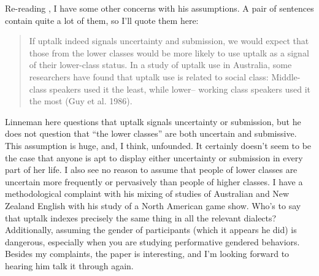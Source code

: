 \documentclass[man,12pt]{apa6}
\begin{document}
Re-reading \citet{Linneman13}, I have some other concerns with his assumptions.
A pair of sentences contain quite a lot of them, so I'll quote them here:
\begin{quote} If uptalk indeed signals uncertainty and submission, we would
	expect that those from the lower classes would be more likely to use
	uptalk as a signal of their lower-class status. In a study of uptalk
	use in Australia, some researchers have found that uptalk use is
	related to social class: Middle-class speakers used it the least, while
lower– working class speakers used it the most (Guy et al. 1986).
\cite[p.~86]{Linneman13} \end{quote} Linneman here questions that uptalk
signals uncertainty or submission, but he does not question that ``the lower
classes'' are both uncertain and submissive.  This assumption is huge, and, I
think, unfounded. It certainly doesn't seem to be the case that anyone is apt
to display either uncertainty or submission in every part of her life. I also
see no reason to assume that people of lower classes are uncertain more
frequently or pervasively than people of higher classes. I have a
methodological complaint with his mixing of studies of Australian and New
Zealand English with his study of a North American game show. 
Who's to say that uptalk indexes precisely the same thing in all the relevant
dialects? Additionally, assuming the gender of participants (which it appears
he did) is dangerous, especially when you are studying performative gendered
behaviors. Besides my complaints, the paper is interesting, and I'm looking
forward to hearing him talk it through again.

\clearpage



\end{document}
